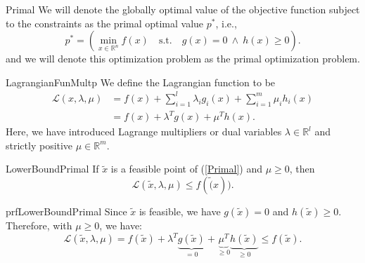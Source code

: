 \begin{theo}{Primal}
    We will denote the globally optimal value of the objective function subject to the constraints as the primal optimal value $p^*$, i\@.e\@., 
    \begin{equation*}
        p^* = \left( \min_{x \in \mathbb{R}^n} f(x) \quad \text{s.t.} \quad g(x) = 0 \ \land \ h(x) \geq 0 \right).
    \end{equation*}
    and we will denote this optimization problem as the primal optimization problem.
\end{theo}

\newpage

\begin{theo}{LagrangianFunMultp}
    We define the Lagrangian function to be 
    \begin{align*}
        \mathcal{L}(x, \lambda, \mu) 
            &= f(x) + \sum_{i=1}^l \lambda_i g_i(x) + \sum_{i=1}^m \mu_i h_i(x) \\
            &= f(x) + \lambda^T g(x) + \mu^T h(x).
    \end{align*}
    Here, we have introduced Lagrange multipliers or dual variables $\lambda \in \mathbb{R}^l$ and strictly positive $\mu \in \mathbb{R}^m$. 
\end{theo}

\begin{lem}{LowerBoundPrimal}
    If $\tilde{x}$ is a feasible point of (\ref{Primal}) and $\mu \geq 0$, then
    \begin{equation*}
        \mathcal{L}(\tilde{x}, \lambda, \mu) \leq f(\tilde(x)).
    \end{equation*}
    \vspace*{-0.5cm}
\end{lem}

\begin{prf}{prfLowerBoundPrimal}
    Since $\tilde{x}$ is feasible, we have $g(\tilde{x}) = 0$ and $h(\tilde{x}) \geq 0$. Therefore, with $\mu \geq 0$, we have:
    \begin{equation*}
        \mathcal{L}(\tilde{x}, \lambda, \mu) = f(\tilde{x}) + \lambda^T \underbrace{g(\tilde{x})}_{=0} + \underbrace{\mu^T}_{\geq 0} \underbrace{h(\tilde{x})}_{\geq 0} \leq f(\tilde{x}).
    \end{equation*}
    \vspace*{-0.5cm}
\end{prf}


